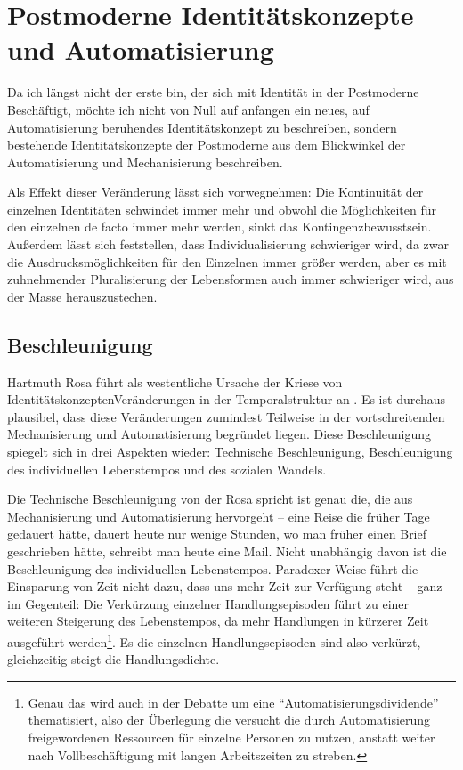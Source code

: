 \section{Postmoderne Identitätskonzepte und Automatisierung}

Da ich längst nicht der erste bin, der sich mit Identität in der Postmoderne Beschäftigt, möchte ich nicht von Null auf anfangen ein neues, auf Automatisierung beruhendes Identitätskonzept zu beschreiben, sondern bestehende Identitätskonzepte der Postmoderne aus dem Blickwinkel der Automatisierung und Mechanisierung beschreiben.

Als Effekt dieser Veränderung lässt sich vorwegnehmen: Die Kontinuität der einzelnen Identitäten schwindet immer mehr und obwohl die Möglichkeiten für den einzelnen de facto immer mehr werden, sinkt das Kontingenzbewusstsein.
Außerdem lässt sich feststellen, dass Individualisierung schwieriger wird, da zwar die Ausdrucksmöglichkeiten für den Einzelnen immer größer werden, aber es mit zuhnehmender Pluralisierung der Lebensformen auch immer schwieriger wird, aus der Masse herauszustechen.


\subsection{Beschleunigung}

Hartmuth Rosa führt als westentliche Ursache der Kriese von IdentitätskonzeptenVeränderungen in der Temporalstruktur an \parencite{rosa}.
Es ist durchaus plausibel, dass diese Veränderungen zumindest Teilweise in der vortschreitenden Mechanisierung und Automatisierung begründet liegen.
Diese Beschleunigung spiegelt sich in drei Aspekten wieder: Technische Beschleunigung, Beschleunigung des individuellen Lebenstempos und des sozialen Wandels.

Die Technische Beschleunigung von der Rosa spricht ist genau die, die aus Mechanisierung und Automatisierung hervorgeht – eine Reise die früher Tage gedauert hätte, dauert heute nur wenige Stunden, wo man früher einen Brief geschrieben hätte, schreibt man heute eine Mail.
Nicht unabhängig davon ist die Beschleunigung des individuellen Lebenstempos.
Paradoxer Weise führt die Einsparung von Zeit nicht dazu, dass uns mehr Zeit zur Verfügung steht – ganz im Gegenteil: Die Verkürzung einzelner Handlungsepisoden führt zu einer weiteren Steigerung des Lebenstempos, da mehr Handlungen in kürzerer Zeit ausgeführt werden\footnote{Genau das wird auch in der Debatte um eine \enquote{Automatisierungsdividende} thematisiert, also der Überlegung die versucht die durch Automatisierung freigewordenen Ressourcen für einzelne Personen zu nutzen, anstatt weiter nach Vollbeschäftigung mit langen Arbeitszeiten zu streben\parencite{faz}.}.
Es die einzelnen Handlungsepisoden sind also verkürzt, gleichzeitig steigt die Handlungsdichte.

